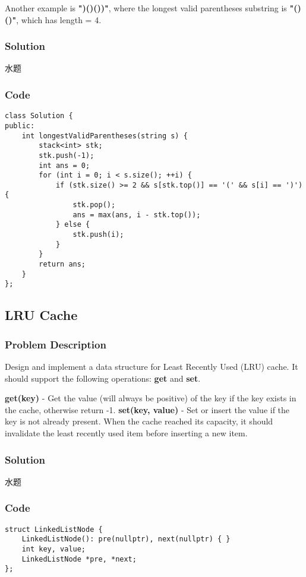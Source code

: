 \documentclass[courier]{article}
\begin{document}
\begin{CJK*}{UTF8}{gkai}
Another example is \textbf{")()())"}, where the longest valid parentheses substring is \textbf{"()()"}, which has length = 4.



\subsubsection*{Solution}
水题

\subsubsection*{Code}
\begin{lstlisting}
class Solution {
public:
    int longestValidParentheses(string s) {
        stack<int> stk;
        stk.push(-1);
        int ans = 0;
        for (int i = 0; i < s.size(); ++i) {
            if (stk.size() >= 2 && s[stk.top()] == '(' && s[i] == ')') {
                stk.pop();
                ans = max(ans, i - stk.top());
            } else {
                stk.push(i);
            }
        }
        return ans;
    }
}; 
\end{lstlisting}


\subsection{ LRU Cache }

\subsubsection*{Problem Description}
Design and implement a data structure for Least Recently Used (LRU) cache. It should support the following operations: \textbf{get} and \textbf{set}.

\textbf{get(key)} - Get the value (will always be positive) of the key if the key exists in the cache, otherwise return -1.
\textbf{set(key, value)} - Set or insert the value if the key is not already present. When the cache reached its capacity, it should invalidate the least recently used item before inserting a new item.



\subsubsection*{Solution}
水题

\subsubsection*{Code}
\begin{lstlisting}
struct LinkedListNode {
    LinkedListNode(): pre(nullptr), next(nullptr) { }
    int key, value;
    LinkedListNode *pre, *next;
};


\end{lstlisting}
\end{CJK*}
\end{document}
